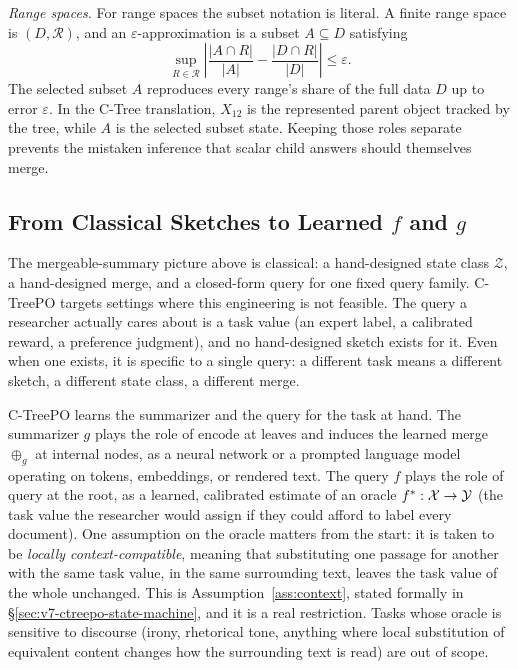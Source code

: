 \emph{Range spaces.} For range spaces the subset notation is literal. A
finite range space is \((D,\mathcal{R})\), and an
\(\varepsilon\)-approximation is a subset \(A\subseteq D\) satisfying
\[
  \sup_{R\in\mathcal{R}}
  \left|
    \frac{|A\cap R|}{|A|}
    -
    \frac{|D\cap R|}{|D|}
  \right|
  \le \varepsilon.
\]
The selected subset \(A\) reproduces every range's share of the full
data \(D\) up to error \(\varepsilon\). In the C-Tree translation,
\(X_{12}\) is the represented parent object
tracked by the tree, while \(A\) is the selected subset state.
Keeping those roles separate prevents the mistaken inference that
scalar child answers should themselves merge.

\subsection{From Classical Sketches to Learned \(f\) and \(g\)}
\label{sec:v7-from-classical-to-learned}

The mergeable-summary picture above is classical: a hand-designed state
class \(\mathcal{Z}\), a hand-designed merge, and a closed-form
\(\mathrm{query}\) for one fixed query family. C-TreePO targets
settings where this engineering is not feasible. The query a researcher
actually cares about is a task value (an expert label, a calibrated
reward, a preference judgment), and no hand-designed sketch exists for
it. Even when one exists, it is specific to a single query: a different
task means a different sketch, a different state class, a different
merge.

C-TreePO learns the summarizer and the query for the task at hand.
The summarizer \(g\) plays the role of \(\mathrm{encode}\) at leaves
and induces the learned merge \(\oplus_g\) at internal nodes, as a
neural network or a prompted language model operating on tokens,
embeddings, or rendered text. The query \(f\) plays the role of
\(\mathrm{query}\) at the root, as a learned, calibrated estimate of an
oracle \(f^\ast:\mathcal{X}\to\mathcal{Y}\) (the task value the researcher
would assign if they could afford to label every document). One
assumption on the oracle matters from the start: it is taken to be
\emph{locally context-compatible}, meaning that substituting one
passage for another with the same task value, in the same
surrounding text, leaves the task value of the whole unchanged.
This is Assumption~\ref{ass:context}, stated formally in
\S\ref{sec:v7-ctreepo-state-machine}, and it is a real restriction. Tasks whose
oracle is sensitive to discourse (irony, rhetorical tone, anything
where local substitution of equivalent content changes how the
surrounding text is read) are out of scope.

